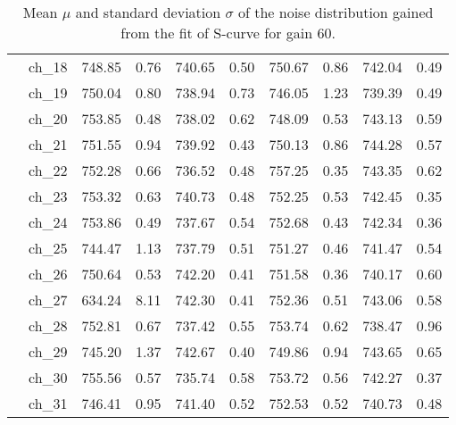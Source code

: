 \begin{table}[H]
{\begin{tabular}{|c|c|c|c|c|c|c|c|c|c|}
    &ch\_18 & 748.85 & 0.76 & 740.65 & 0.50 & 750.67 & 0.86 & 742.04 & 0.49 \\
    &ch\_19 & 750.04 & 0.80 & 738.94 & 0.73 & 746.05 & 1.23 & 739.39 & 0.49 \\
    &ch\_20 & 753.85 & 0.48 & 738.02 & 0.62 & 748.09 & 0.53 & 743.13 & 0.59 \\
    &ch\_21 & 751.55 & 0.94 & 739.92 & 0.43 & 750.13 & 0.86 & 744.28 & 0.57 \\
    &ch\_22 & 752.28 & 0.66 & 736.52 & 0.48 & 757.25 & 0.35 & 743.35 & 0.62 \\
    &ch\_23 & 753.32 & 0.63 & 740.73 & 0.48 & 752.25 & 0.53 & 742.45 & 0.35 \\
    &ch\_24 & 753.86 & 0.49 & 737.67 & 0.54 & 752.68 & 0.43 & 742.34 & 0.36 \\
    &ch\_25 & 744.47 & 1.13 & 737.79 & 0.51 & 751.27 & 0.46 & 741.47 & 0.54 \\
    &ch\_26 & 750.64 & 0.53 & 742.20 & 0.41 & 751.58 & 0.36 & 740.17 & 0.60 \\
    &ch\_27 & 634.24 & 8.11 & 742.30 & 0.41 & 752.36 & 0.51 & 743.06 & 0.58 \\
    &ch\_28 & 752.81 & 0.67 & 737.42 & 0.55 & 753.74 & 0.62 & 738.47 & 0.96 \\
    &ch\_29 & 745.20 & 1.37 & 742.67 & 0.40 & 749.86 & 0.94 & 743.65 & 0.65 \\
    &ch\_30 & 755.56 & 0.57 & 735.74 & 0.58 & 753.72 & 0.56 & 742.27 & 0.37 \\
    &ch\_31 & 746.41 & 0.95 & 741.40 & 0.52 & 752.53 & 0.52 & 740.73 & 0.48 \\
    
    \hline
     
    \end{tabular}
    }
    \caption{Mean $\mu$ and standard deviation $\sigma$ of the noise distribution gained from the fit of S-curve for gain 60.}
    \label{tab:noise_parameter_1}
\end{table}

